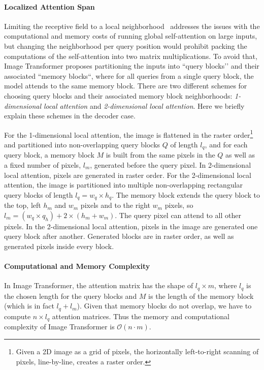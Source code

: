 \paragraph{Localized Attention Span} Limiting the receptive field to a local neighborhood~\citep{parmar2018image, parmar2019stand} addresses the issues with the computational and memory costs of running global self-attention on large inputs, but changing the neighborhood per query position would prohibit packing the computations of the self-attention into two matrix multiplications. To avoid that, Image Transformer proposes partitioning the inputs into ``query blocks’’ and their associated ``memory blocks``, where for all queries from a single query block, the model attends to the same memory block. There are two different schemes for choosing query blocks and their associated memory block neighborhoods: \emph{1-dimensional local attention} and \emph{2-dimensional local attention}. Here we briefly explain these schemes in the decoder case. 

For the 1-dimensional local attention, the image is flattened in the raster order\footnote{Given a 2D image as a grid of pixels, the horizontally left-to-right scanning of pixels, line-by-line, creates a raster order.} and partitioned into non-overlapping query blocks $Q$ of length $l_q$, and for each query block, a memory block $M$ is built from the same pixels in the $Q$ as well as a fixed number of pixels, $l_m$, generated before the query pixel.  In 2-dimensional local attention, pixels are generated in raster order. For the 2-dimensional local attention, the image is partitioned into multiple non-overlapping rectangular query blocks of length $l_q = w_q \times h_q$. The memory block extends the query block to the top, left $h_m$ and  $w_m$ pixels and to the right $w_m$ pixels, so $l_m = (w_q \times q_h) + 2 \times (h_m  + w_m)$. The query pixel can attend to all other pixels. In the 2-dimensional local attention, pixels in the image are generated one query block after another. Generated blocks are in raster order, as well as generated pixels inside every block. 

\paragraph{Computational and Memory Complexity} In Image Transformer, the attention matrix has the shape of $l_q \times m$, where $l_q$ is the chosen length for the query blocks and $M$ is the length of the memory block (which is in fact $l_q + l_m$). Given that memory blocks do not overlap, we have to compute $n \times l_q$ attention matrices. Thus the memory and computational complexity of Image Transformer is $\mathcal{O}(n\cdot m)$.

